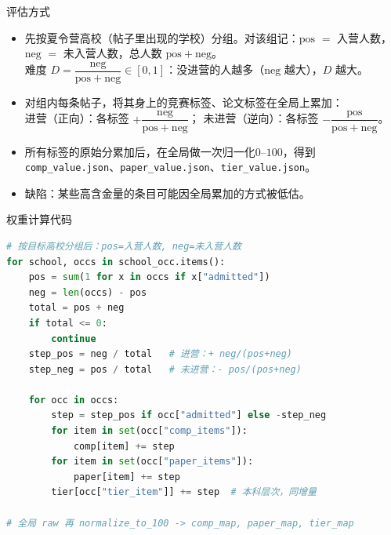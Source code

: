 \documentclass[10pt, aspectratio=169]{beamer}
\begin{document}
\begin{frame}{评估方式}
    \begin{itemize}
        \item 先按夏令营高校（帖子里出现的学校）分组。对该组记：$\mathrm{pos}$ $=$ 入营人数，$\mathrm{neg}$ $=$ 未入营人数，总人数 $\mathrm{pos}+\mathrm{neg}$。\\
        难度 $D=\dfrac{\mathrm{neg}}{\mathrm{pos}+\mathrm{neg}}\in[0,1]$：没进营的人越多（$\mathrm{neg}$ 越大），$D$ 越大。
        \item 对组内每条帖子，将其身上的竞赛标签、论文标签在全局上累加：\\
        进营（正向）：各标签 $+\dfrac{\mathrm{neg}}{\mathrm{pos}+\mathrm{neg}}$；\quad
        未进营（逆向）：各标签 $-\dfrac{\mathrm{pos}}{\mathrm{pos}+\mathrm{neg}}$。\\
        \item 所有标签的原始分累加后，在全局做一次归一化$0$--$100$，得到 \texttt{comp\_value.json}、\texttt{paper\_value.json}、\texttt{tier\_value.json}。
        \item 缺陷：某些高含金量的条目可能因全局累加的方式被低估。
    \end{itemize}
\end{frame}

\begin{frame}[fragile]{权重计算代码}
    \begin{lstlisting}[language=Python, caption= pos/neg 组内增量]
# 按目标高校分组后：pos=入营人数, neg=未入营人数
for school, occs in school_occ.items():
    pos = sum(1 for x in occs if x["admitted"])
    neg = len(occs) - pos
    total = pos + neg
    if total <= 0:
        continue
    step_pos = neg / total   # 进营：+ neg/(pos+neg)
    step_neg = pos / total   # 未进营：- pos/(pos+neg)

    for occ in occs:
        step = step_pos if occ["admitted"] else -step_neg
        for item in set(occ["comp_items"]):
            comp[item] += step
        for item in set(occ["paper_items"]):
            paper[item] += step
        tier[occ["tier_item"]] += step  # 本科层次，同增量

# 全局 raw 再 normalize_to_100 -> comp_map, paper_map, tier_map
    \end{lstlisting}
\end{frame}
\end{document}
